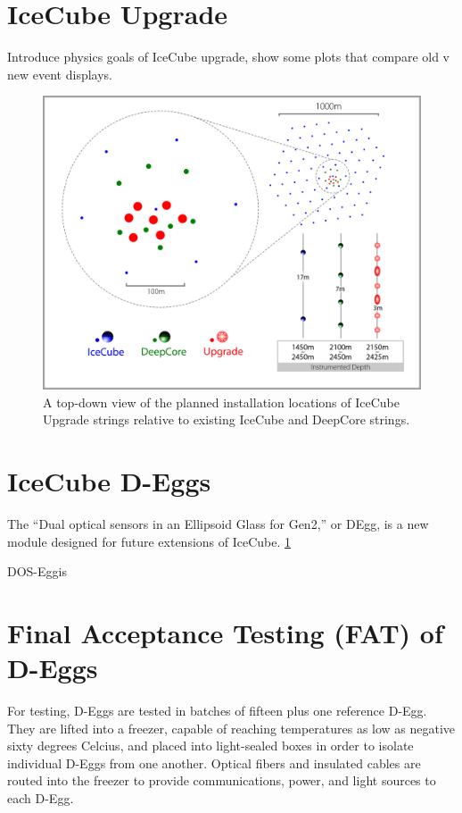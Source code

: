 \documentclass[main.tex]{subfiles}
\begin{document}
\section{IceCube Upgrade}

Introduce physics goals of IceCube upgrade, show some plots that compare old v new event displays. 

\begin{figure}
    \centering
    \includegraphics[width=\linewidth]{figures/ICUpgradeLayout_V4b.jpg}
    \caption{A top-down view of the planned installation locations of IceCube Upgrade strings relative to existing IceCube and DeepCore strings.}
    \label{fig:degglayout}
\end{figure}

\section{IceCube D-Eggs}

The ``Dual optical sensors in an Ellipsoid Glass for Gen2,'' or DEgg, is a new module designed for future extensions of IceCube. \ref{fig:degglayout}

DOS-Eggis 

\section{Final Acceptance Testing (FAT) of D-Eggs}

For testing, D-Eggs are tested in batches of fifteen plus one reference D-Egg. 
They are lifted into a freezer, capable of reaching temperatures as low as negative sixty degrees Celcius, and placed into light-sealed boxes in order to isolate individual D-Eggs from one another. 
Optical fibers and insulated cables are routed into the freezer to provide communications, power, and light sources to each D-Egg. 
\end{document}
